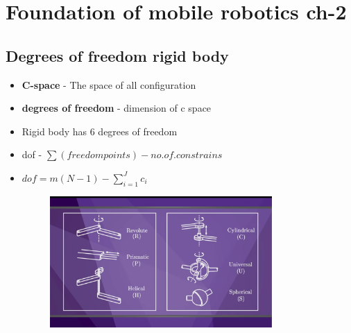 \documentclass[a4paper]{article}
\begin{document}
    \section{Foundation of mobile robotics ch-2}
    \subsection{Degrees of freedom rigid body}
    \begin{itemize}
        \item \textbf{C-space} - The space of all configuration
        \item \textbf{degrees of freedom} - dimension of c space 
        \item Rigid body has 6 degrees of freedom
        \item dof - $\sum (freedom points) - no.of.constrains$
        \item $dof = m(N-1) - \sum_{i=1}^J c_i$ 
            \begin{figure}[htpb]
                        \centering
                        \includegraphics[width=0.8\textwidth]{joints.png}
                        \caption{}
                        \label{fig:}
                    \end{figure}
                    
    \end{itemize}
\end{document}
